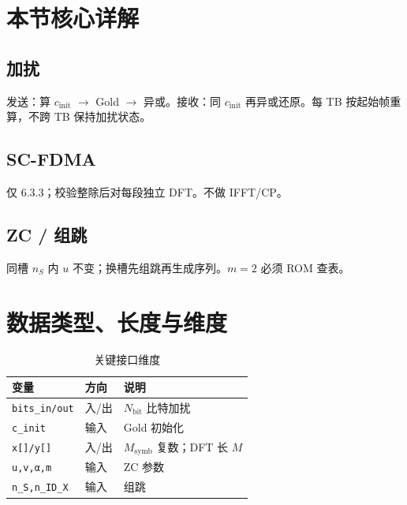 \documentclass[11pt,a4paper]{ctexart}
\begin{document}
\section{本节核心详解}

\subsection{加扰}

发送：算 $c_{\mathrm{init}}$ $\rightarrow$ Gold $\rightarrow$ 异或。接收：同 $c_{\mathrm{init}}$ 再异或还原。每 TB 按起始帧重算，不跨 TB 保持加扰状态。

\subsection{SC-FDMA}

仅 6.3.3；校验整除后对每段独立 DFT。不做 IFFT/CP。

\subsection{ZC / 组跳}

同槽 $n_S$ 内 $u$ 不变；换槽先组跳再生成序列。$m{=}2$ 必须 ROM 查表。

\section{数据类型、长度与维度}

\begin{longtable}{L{3.5cm}L{2.5cm}L{8cm}}
\caption{关键接口维度\label{tab:6579-dim}} \\
\toprule
\textbf{变量} & \textbf{方向} & \textbf{说明} \\
\midrule
\texttt{bits\_in/out} & 入/出 & $N_{\mathrm{bit}}$ 比特加扰 \\
\texttt{c\_init} & 输入 & Gold 初始化 \\
\texttt{x[]/y[]} & 入/出 & $M_{\mathrm{symb}}$ 复数；DFT 长 $M$ \\
\texttt{u,v,α,m} & 输入 & ZC 参数 \\
\texttt{n\_S,n\_ID\_X} & 输入 & 组跳 \\
\bottomrule
\end{longtable}
\end{document}
